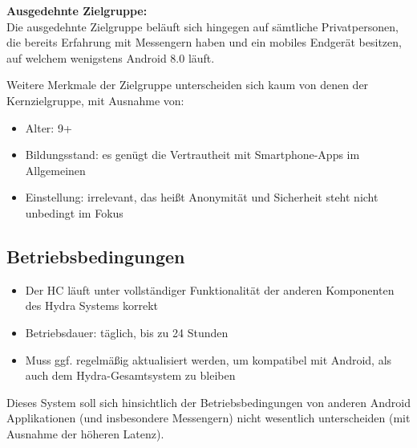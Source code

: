 \textbf{Ausgedehnte Zielgruppe:}\\

Die ausgedehnte Zielgruppe beläuft sich hingegen auf sämtliche Privatpersonen, die bereits Erfahrung mit Messengern haben und ein mobiles Endgerät besitzen, auf welchem wenigstens Android 8.0 läuft.


Weitere Merkmale der Zielgruppe unterscheiden sich kaum von denen der Kernzielgruppe, mit Ausnahme von:
\begin{itemize}
		\item Alter: 9+
		\item Bildungsstand: es genügt die Vertrautheit mit Smartphone-Apps im Allgemeinen
		\item Einstellung: irrelevant, das heißt Anonymität und Sicherheit steht nicht unbedingt im Fokus
\end{itemize}


\subsection{Betriebsbedingungen}
\begin{itemize}
	\item Der \ac{HC} läuft unter vollständiger Funktionalität der anderen Komponenten des Hydra Systems korrekt
	\item Betriebsdauer: täglich, bis zu 24 Stunden
	\item Muss ggf. regelmäßig aktualisiert werden, um kompatibel mit Android, als auch dem Hydra-Gesamtsystem zu bleiben

\end{itemize}
Dieses System soll sich hinsichtlich der Betriebsbedingungen von anderen Android Applikationen (und insbesondere Messengern) nicht wesentlich unterscheiden (mit Ausnahme der höheren Latenz).